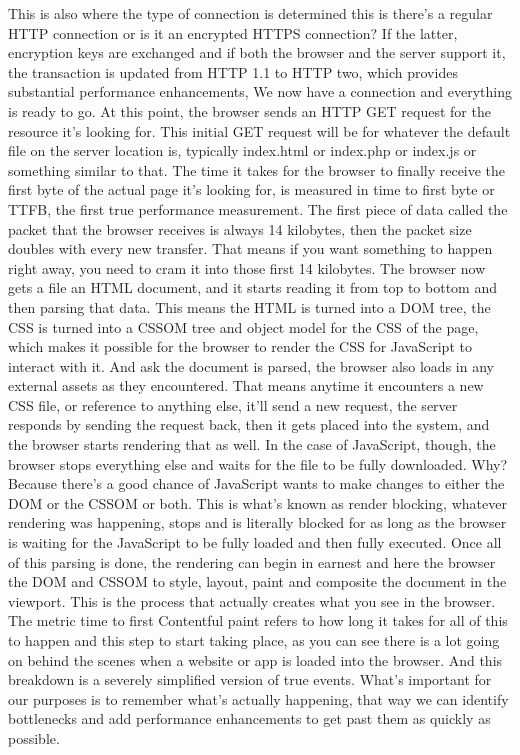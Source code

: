 This is also where the type of connection is determined this is there's a regular 
HTTP connection or is it an encrypted HTTPS connection? If the latter, encryption 
keys are exchanged and if both the browser and the server support it, the 
transaction is updated from HTTP 1.1 to HTTP two, which provides substantial 
performance enhancements, We now have a connection and everything is ready to go. 
At this point, the browser sends an HTTP GET request for the resource it's looking 
for. This initial GET request will be for whatever the default file on the server 
location is, typically index.html or index.php or index.js or something similar to
that. The time it takes for the browser to finally receive the first byte of the 
actual page it's looking for, is measured in time to first byte or TTFB, the first
true performance measurement. The first piece of data called the packet that the
browser receives is always 14 kilobytes, then the packet size doubles with every
new transfer. That means if you want something to happen right away, you need 
to cram it into those first 14 kilobytes. The browser now gets a file an HTML 
document, and it starts reading it from top to bottom and then parsing that 
data. This means the HTML is turned into a DOM tree, the CSS is turned into a 
CSSOM tree and object model for the CSS of the page, which makes it possible 
for the browser to render the CSS for JavaScript to interact with it. And ask 
the document is parsed, the browser also loads in any external assets as they 
encountered. That means anytime it encounters a new CSS file, or reference to 
anything else, it'll send a new request, the server responds by sending the 
request back, then it gets placed into the system, and the browser starts 
rendering that as well. In the case of JavaScript, though, the browser stops 
everything else and waits for the file to be fully downloaded. Why? Because 
there's a good chance of JavaScript wants to make changes to either the DOM or
the CSSOM or both. This is what's known as render blocking, whatever
rendering was happening, stops and is literally blocked for as long as the browser 
is waiting for the JavaScript to be fully loaded and then fully executed. Once all 
of this parsing is done, the rendering can begin in earnest and here the browser 
the DOM and CSSOM to style, layout, paint and composite the document in the 
viewport. This is the process that actually creates what you see in the browser. 
The metric time to first Contentful paint refers to how long it takes for all of 
this to happen and this step to start taking place, as you can see there is a lot 
going on behind the scenes when a website or app is loaded into the browser. And 
this breakdown is a severely simplified version of true events. What's important 
for our purposes is to remember what's actually happening, that way we can identify
bottlenecks and add performance enhancements to get past them as quickly as 
possible.


